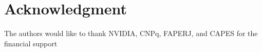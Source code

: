 \documentclass[10pt, conference]{IEEEtran}
\begin{document}
\iffinal
\section*{Acknowledgment}
%
The authors would like to thank NVIDIA, CNPq, FAPERJ, and CAPES for the financial support
\fi







%
%


\end{document}
